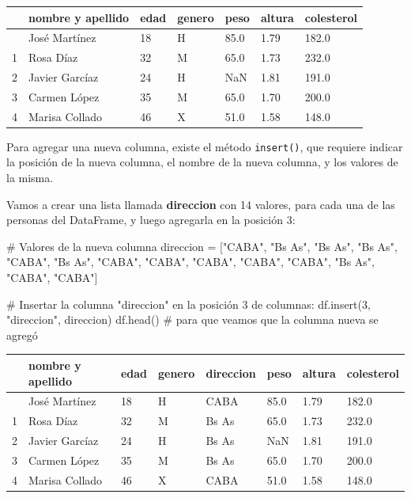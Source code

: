 \documentclass[
  letterpaper,
  DIV=11,
  numbers=noendperiod]{scrreprt}
\newenvironment{Shaded}{\begin{snugshade}}{\end{snugshade}}
\newcommand{\CommentTok}[1]{\textcolor[rgb]{0.37,0.37,0.37}{#1}}
\newcommand{\DecValTok}[1]{\textcolor[rgb]{0.68,0.00,0.00}{#1}}
\newcommand{\NormalTok}[1]{\textcolor[rgb]{0.00,0.23,0.31}{#1}}
\newcommand{\OperatorTok}[1]{\textcolor[rgb]{0.37,0.37,0.37}{#1}}
\newcommand{\StringTok}[1]{\textcolor[rgb]{0.13,0.47,0.30}{#1}}
\begin{document}
\begin{longtable}[]{@{}lllllll@{}}
\toprule\noalign{}
& nombre y apellido & edad & genero & peso & altura & colesterol \\
\midrule\noalign{}
\endhead
\bottomrule\noalign{}
\endlastfoot
0 & José Martínez & 18 & H & 85.0 & 1.79 & 182.0 \\
1 & Rosa Díaz & 32 & M & 65.0 & 1.73 & 232.0 \\
2 & Javier Garcíaz & 24 & H & NaN & 1.81 & 191.0 \\
3 & Carmen López & 35 & M & 65.0 & 1.70 & 200.0 \\
4 & Marisa Collado & 46 & X & 51.0 & 1.58 & 148.0 \\
\end{longtable}

Para agregar una nueva columna, existe el método \texttt{insert()}, que
requiere indicar la posición de la nueva columna, el nombre de la nueva
columna, y los valores de la misma.

Vamos a crear una lista llamada \textbf{direccion} con 14 valores, para
cada una de las personas del DataFrame, y luego agregarla en la posición
3:

\begin{Shaded}
\begin{Highlighting}[]
\CommentTok{\# Valores de la nueva columna}
\NormalTok{direccion }\OperatorTok{=}\NormalTok{ [}\StringTok{"CABA"}\NormalTok{, }\StringTok{"Bs As"}\NormalTok{, }\StringTok{"Bs As"}\NormalTok{, }\StringTok{"Bs As"}\NormalTok{, }\StringTok{"CABA"}\NormalTok{, }\StringTok{"Bs As"}\NormalTok{, }\StringTok{"CABA"}\NormalTok{, }\StringTok{"CABA"}\NormalTok{, }\StringTok{"CABA"}\NormalTok{, }\StringTok{"CABA"}\NormalTok{, }\StringTok{"CABA"}\NormalTok{, }\StringTok{"Bs As"}\NormalTok{, }\StringTok{"CABA"}\NormalTok{, }\StringTok{"CABA"}\NormalTok{]}

\CommentTok{\# Insertar la columna "direccion" en la posición 3 de columnas:}
\NormalTok{df.insert(}\DecValTok{3}\NormalTok{, }\StringTok{"direccion"}\NormalTok{, direccion)}
\NormalTok{df.head() }\CommentTok{\# para que veamos que la columna nueva se agregó}
\end{Highlighting}
\end{Shaded}

\begin{longtable}[]{@{}llllllll@{}}
\toprule\noalign{}
& nombre y apellido & edad & genero & direccion & peso & altura &
colesterol \\
\midrule\noalign{}
\endhead
\bottomrule\noalign{}
\endlastfoot
0 & José Martínez & 18 & H & CABA & 85.0 & 1.79 & 182.0 \\
1 & Rosa Díaz & 32 & M & Bs As & 65.0 & 1.73 & 232.0 \\
2 & Javier Garcíaz & 24 & H & Bs As & NaN & 1.81 & 191.0 \\
3 & Carmen López & 35 & M & Bs As & 65.0 & 1.70 & 200.0 \\
4 & Marisa Collado & 46 & X & CABA & 51.0 & 1.58 & 148.0 \\
\end{longtable}
\end{document}
